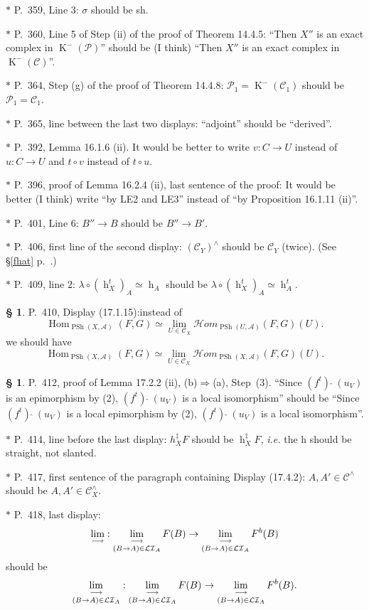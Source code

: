 \documentclass[12pt]{article}
\theoremstyle{remark}
\theoremstyle{definition}
\newtheorem{s}[thm]{\S}
\newcommand{\nn}{\noindent}
\newcommand{\cc}{\mathcal}
\newcommand{\mc}{\mathcal}
\newcommand{\oo}{\operatorname}
\newcommand{\A}{\mathcal A}
\newcommand{\C}{\mathcal C}
\newcommand{\fthat}{(f^t)\ \widehat{}\ }
\newcommand{\then}{\Rightarrow}
\newcommand{\ilim}{\operatornamewithlimits{\underset{\longrightarrow}{lim}}}
\DeclareMathOperator{\Hom}{Hom}
\begin{document}
\nn$*$ P.~359, Line 3: $\sigma$ should be sh.

\nn$*$ P.~360, Line 5 of Step (ii) of the proof of Theorem 14.4.5: ``Then $X''$ is an exact complex in $\oo K^-(\cc P)$'' should be (I think) ``Then $X''$ is an exact complex in $\oo K^-(\cc C)$''.

\nn$*$ P.~364, Step (g) of the proof of Theorem 14.4.8: $\mc P_1=\oo K^-(\C_1)$ should be $\mc P_1=\C_1$.

\nn$*$ P.~365, line between the last two displays: ``adjoint'' should be ``derived''.

\nn$*$ P.~392, Lemma 16.1.6 (ii). It would be better to write $v:C\to U$ instead of $u:C\to U$ and $t\circ v$ instead of $t\circ u$.

\nn$*$ P.~396, proof of Lemma 16.2.4 (ii), last sentence of the proof: It would be better (I think) write ``by LE2 and LE3'' instead of ``by Proposition 16.1.11 (ii)''.

\nn$*$ P.~401, Line 6: $B''\to B$ should be $B''\to B'$.

\nn$*$ P.~406, first line of the second display: $(\C_Y)^\wedge$ should be $\C_Y$ (twice). (See \S\ref{fhat} p.~\pageref{fhat}.)

\nn$*$ P.~409, line 2: $\lambda\circ(\oo h_X^t)_A\simeq\oo h_A$ should be $\lambda\circ(\oo h_X^t)_A\simeq\oo h_A^t$. 

\begin{s}\label{17115typo}
P.~410, Display (17.1.15):instead of 
$$
\Hom_{\oo{PSh}(X,\A)}(F,G)\simeq\lim_{U\in\C_X}\cc Hom_{\oo{PSh}(U,\A)}(F,G)(U).
$$
we should have
$$
\Hom_{\oo{PSh}(X,\A)}(F,G)\simeq\lim_{U\in\C_X}\cc Hom_{\oo{PSh}(X,\A)}(F,G)(U).
$$
\end{s}

%

\begin{s}\label{1722}
P.~412, proof of Lemma 17.2.2 (ii), (b)$\then$(a), Step~(3). ``Since $\fthat(u_V)$ is an epimorphism by (2), $\fthat(u_V)$ is a local isomorphism'' should be ``Since $\fthat(u_V)$ is a local epimorphism by (2), $\fthat(u_V)$ is a local isomorphism''.
\end{s}

\nn$*$ P.~414, line before the last display: $h_X^\ddagger F$ should be $\oo h_X^\ddagger F$, \emph{i.e.} the h should be straight, not slanted. 

\nn$*$ P.~417, first sentence of the paragraph containing Display (17.4.2): $A,A'\in\C^\wedge$ should be $A,A'\in\C_X^\wedge$. 

\nn$*$ P.~418, last display: 
$$
\ilim:\ilim_{(B\to A)\in\cc{LI}_A}F(B)\to\ilim_{(B\to A)\in\cc{LI}_A}F^b(B)
$$ 
should be 
$$
\ilim_{(B\to A)\in\cc{LI}_A}:\ilim_{(B\to A)\in\cc{LI}_A}F(B)\to\ilim_{(B\to A)\in\cc{LI}_A}F^b(B).
$$
\end{document}
